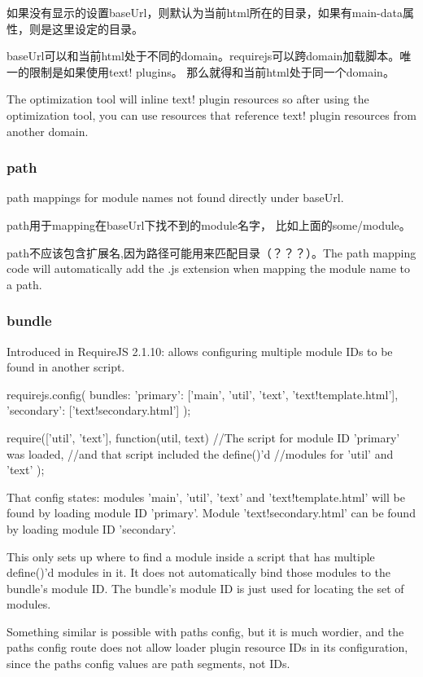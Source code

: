 如果没有显示的设置baseUrl，则默认为当前html所在的目录，如果有main-data属性，则是这里设定的目录。

baseUrl可以和当前html处于不同的domain。requirejs可以跨domain加载脚本。唯一的限制是如果使用text! plugins。 那么就得和当前html处于同一个domain。

The optimization tool will inline text! plugin resources so after using the optimization tool, you can use resources that reference text! plugin resources from another domain.

\subsubsection{path}
path mappings for module names not found directly under baseUrl.

path用于mapping在baseUrl下找不到的module名字， 比如上面的some/module。

path不应该包含扩展名,因为路径可能用来匹配目录（？？？）。The path mapping code will automatically add the .js extension when mapping the module name to a path. 

\subsubsection{bundle}
Introduced in RequireJS 2.1.10: allows configuring multiple module IDs to be found in another script.

\begin{JavaScript}
requirejs.config({
    bundles: {
        'primary': ['main', 'util', 'text', 'text!template.html'],
        'secondary': ['text!secondary.html']
    }
});

require(['util', 'text'], function(util, text) {
    //The script for module ID 'primary' was loaded,
    //and that script included the define()'d
    //modules for 'util' and 'text'
});
\end{JavaScript}

That config states: modules 'main', 'util', 'text' and 'text!template.html' will be found by loading module ID 'primary'. Module 'text!secondary.html' can be found by loading module ID 'secondary'.


This only sets up where to find a module inside a script that has multiple define()'d modules in it. It does not automatically bind those modules to the bundle's module ID. The bundle's module ID is just used for locating the set of modules.

Something similar is possible with paths config, but it is much wordier, and the paths config route does not allow loader plugin resource IDs in its configuration, since the paths config values are path segments, not IDs.


